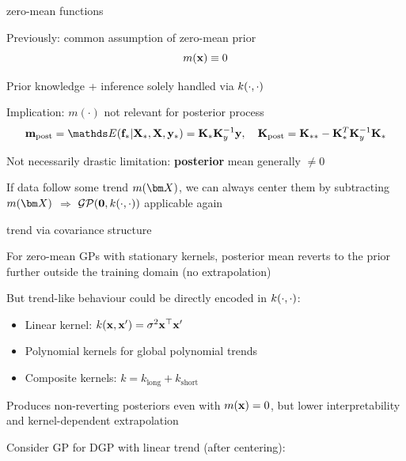 \documentclass[11pt,compress,t,notes=noshow, xcolor=table]{beamer}
\begin{document}


\begin{framei}[sep=L]{zero-mean functions}
\item Previously: common assumption of zero-mean prior $$m(\mathbf{x}) \equiv 0$$
\item Prior knowledge + inference solely handled via $k(\cdot, \cdot)$
\item Implication: $m(\cdot)$ not relevant for posterior process
$$\mv_{\text{post}} = \E(\fs | \Xs, \Xmat, \ys) = \Ks \Ky^{-1} \yv, \quad \Kmat_{\text{post}} = \Kss - \Ks^T \Ky^{-1} \Ks$$
\item Not necessarily drastic limitation: \textbf{posterior} mean generally $\neq 0$
\item If data follow some trend $\mX$, we can always center them by subtracting $\mX$ $\Rightarrow$ $\mathcal{GP}(\mathbf{0}, k(\cdot, \cdot))$ applicable again
\end{framei}



\begin{framei}[sep=S]{trend via covariance structure}
\item For zero-mean GPs with stationary kernels, posterior mean reverts to the prior further outside the training domain (no extrapolation)
\item But trend-like behaviour could be directly encoded in $k(\cdot, \cdot)$:
\begin{itemize}
  \item Linear kernel: $k(\mathbf{x},\mathbf{x}')=\sigma^2 \mathbf{x}^\top \mathbf{x}'$
  \item Polynomial kernels for global polynomial trends
  \item Composite kernels: $k = k_{\text{long}} + k_{\text{short}}$
\end{itemize}
\item Produces non-reverting posteriors even with $m(\mathbf{x})=0$, but lower interpretability and kernel-dependent extrapolation
\item Consider GP for DGP with linear trend (after centering):

\vfill


\end{framei}
\end{document}
